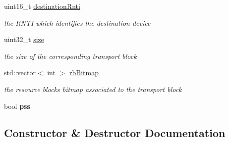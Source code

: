 \begin{DoxyCompactItemize}
uint16\+\_\+t \hyperlink{structns3_1_1millicar_1_1MmWaveSidelinkSpectrumSignalParameters_ac8ff697cac99b54d01a548783640c242}{destination\+Rnti}
\begin{DoxyCompactList}\small\item\em the R\+N\+TI which identifies the destination device \end{DoxyCompactList}\item 
\mbox{\label{structns3_1_1millicar_1_1MmWaveSidelinkSpectrumSignalParameters_ac95661f1e69b935be32dd73d26d5ada5}} 
uint32\+\_\+t \hyperlink{structns3_1_1millicar_1_1MmWaveSidelinkSpectrumSignalParameters_ac95661f1e69b935be32dd73d26d5ada5}{size}
\begin{DoxyCompactList}\small\item\em the size of the corresponding transport block \end{DoxyCompactList}\item 
\mbox{\label{structns3_1_1millicar_1_1MmWaveSidelinkSpectrumSignalParameters_a38ff1054186e12389fa9003c46b20e18}} 
std\+::vector$<$ int $>$ \hyperlink{structns3_1_1millicar_1_1MmWaveSidelinkSpectrumSignalParameters_a38ff1054186e12389fa9003c46b20e18}{rb\+Bitmap}
\begin{DoxyCompactList}\small\item\em the resource blocks bitmap associated to the transport block \end{DoxyCompactList}\item 
\mbox{\label{structns3_1_1millicar_1_1MmWaveSidelinkSpectrumSignalParameters_a15bd0c3e1ff3ab2fd3008eda2d242c23}} 
bool {\bfseries pss}
\end{DoxyCompactItemize}


\subsection{Constructor \& Destructor Documentation}
\mbox{\label{structns3_1_1millicar_1_1MmWaveSidelinkSpectrumSignalParameters_ae23417b732d56ba404ddf098f21d264a}} 
